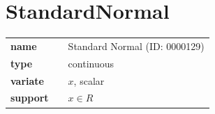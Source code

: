 %
%
% 
%
%
%
%
\smallskip\section*{StandardNormal} 

  \bigskip 

\begin{tabular}{p{2cm}cl}
\textbf{name} & & Standard Normal (ID: 0000129)\\ 
 
\textbf{type} & & continuous \\ 

\textbf{variate} & & $x$, scalar \\ 

\textbf{support} & & $x \in R$
\end{tabular}

